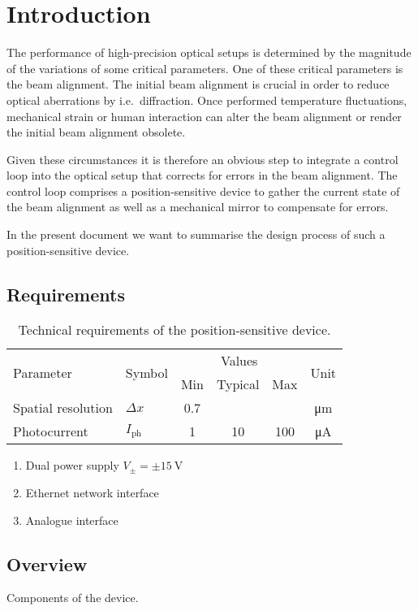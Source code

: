\section{Introduction}

The performance of high-precision optical setups is determined by the magnitude of the variations of some critical parameters.
One of these critical parameters is the beam alignment.
The initial beam alignment is crucial in order to reduce optical aberrations by i.e.\ diffraction.
Once performed temperature fluctuations, mechanical strain or human interaction can alter the beam alignment or render the initial beam alignment obsolete.

Given these circumstances it is therefore an obvious step to integrate a control loop into the optical setup that corrects for errors in the beam alignment.
The control loop comprises a position-sensitive device to gather the current state of the beam alignment as well as a mechanical mirror to compensate for errors. 

In the present document we want to summarise the design process of such a position-sensitive device.

\subsection{Requirements}

\begin{table}[H]
	\centering
	\begin{tabular}{llcccc}
		\toprule
			\multirow{2}[3]{*}{Parameter} &
			\multirow{2}[3]{*}{Symbol} &
			\multicolumn{3}{c}{Values} &
			\multirow{2}[3]{*}{Unit} \\
			\cmidrule(lr){3-4} & & Min & Typical & Max & \\
		\midrule
			Spatial resolution & $\Delta x$ & \num{0.7} & & & \si{\micro\meter} \\
			Photocurrent & $I_\text{ph}$ & \num{1} & \num{10} & \num{100} & \si{\micro\ampere} \\
		\bottomrule
	\end{tabular}
	\caption{Technical requirements of the position-sensitive device.}
\end{table}

\begin{enumerate}
    \item Dual power supply $V_\pm=\pm\SI{15}{\volt}$
    \item Ethernet network interface
    \item Analogue interface
\end{enumerate}

\subsection{Overview}

Components of the device.